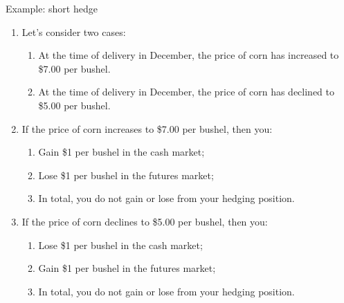 \documentclass[table,xcolor=pdftex,dvipsnames]{beamer}\usepackage[]{graphicx}\usepackage[]{color}
\begin{document}
\begin{frame}{Example: short hedge}
\begin{enumerate}[label=\textbullet]
  \item Let's consider two cases:
      \begin{enumerate}[label=\arabic*)]
            \item At the time of delivery in December, the price of corn has increased to \$7.00 per bushel.
            \item At the time of delivery in December, the price of corn has declined to \$5.00 per bushel.
      \end{enumerate}
  \item If the price of corn increases to \$7.00 per bushel, then you:
      \begin{enumerate}[label=-]
            \item Gain \$1 per bushel in the cash market;
            \item Lose \$1 per bushel in the futures market;
            \item In total, you do not gain or lose from your hedging position.
      \end{enumerate}
  \item If the price of corn declines to \$5.00 per bushel, then you:
      \begin{enumerate}[label=-]
            \item Lose \$1 per bushel in the cash market;
            \item Gain \$1 per bushel in the futures market;
            \item In total, you do not gain or lose from your hedging position.
      \end{enumerate}
\end{enumerate}
\end{frame}

\end{document}
